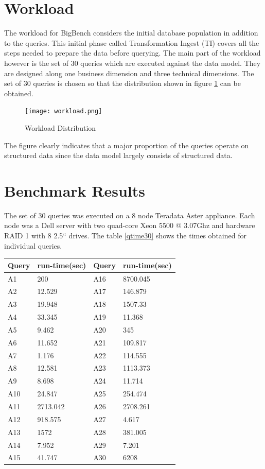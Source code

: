 \documentclass[12pt]{book}
\begin{document}
\section{Workload}
The workload for BigBench considers the initial database population in addition to the queries. This initial phase called
Transformation Ingest (TI) covers all the steps needed to prepare the data before querying.
The main part of the workload however is the set of 30 queries which are executed against the data model. They are designed along one business
dimension and three technical dimensions.
The set of 30 queries is chosen so that the distribution shown in figure \ref{workload} can be obtained.
\begin{figure}[h]
 \centering
 \texttt{[image: workload.png]}
 \caption{Workload Distribution \label{workload}}
\end{figure}
The figure clearly indicates that a major proportion of the queries operate on structured data since the data model largely consists of 
structured data.
\section{Benchmark Results}
The set of 30 queries was executed on a 8 node Teradata Aster appliance. Each node was a Dell server with two quad-core Xeon 5500 @ 3.07Ghz and 
hardware RAID 1 with 8 2.5{``} drives. The table \ref{qtime30} shows the times obtained for individual queries.
\begin{center}
\begin{tabular}{ll||ll}\label{qtime30}
Query & run-time(sec) & Query & run-time(sec)\\\hline
A1 & 200 & A16 & 8700.045\\
A2 & 12.529 & A17 & 146.879\\
A3 & 19.948 & A18 & 1507.33\\
A4 & 33.345 & A19 & 11.368\\
A5 & 9.462 & A20 & 345\\
A6 & 11.652 & A21 & 109.817\\
A7 & 1.176 & A22 & 114.555\\
A8 & 12.581 & A23 & 1113.373\\
A9 & 8.698 & A24 & 11.714\\
A10 & 24.847 & A25 & 254.474\\
A11 & 2713.042 & A26 & 2708.261\\
A12 & 918.575 & A27 & 4.617\\
A13 & 1572 & A28 & 381.005\\
A14 & 7.952 & A29 & 7.201\\
A15 & 41.747 & A30 & 6208
\end{tabular}
\end{center}
\end{document}
